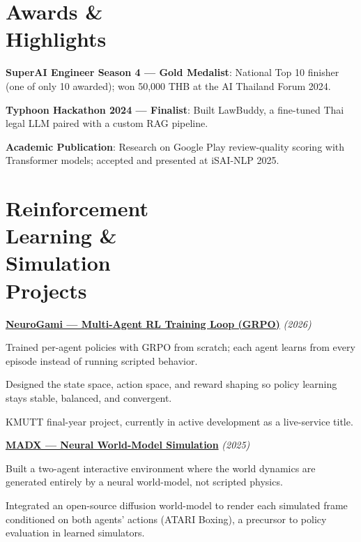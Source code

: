 \documentclass[margin,line]{resume}
\begin{document}
\begin{resume}
    \section{\mysidestyle \textbf{Awards \&\\Highlights}}
    \begin{list2}
    \item \textbf{SuperAI Engineer Season 4 --- Gold Medalist}: National Top 10 finisher (one of only 10 awarded); won 50,000 THB at the AI Thailand Forum 2024.
    \item \textbf{Typhoon Hackathon 2024 --- Finalist}: Built LawBuddy, a fine-tuned Thai legal LLM paired with a custom RAG pipeline.
    \item \textbf{Academic Publication}: Research on Google Play review-quality scoring with Transformer models; accepted and presented at iSAI-NLP 2025.
    \end{list2}
    \vspace{-3mm}

    \section{\mysidestyle \textbf{Reinforcement\\Learning \&\\Simulation\\Projects}}

    \underline{\textbf{NeuroGami --- Multi-Agent RL Training Loop (GRPO)}} \hfill \textit{(2026)} \vspace{0.3mm}
    \begin{list2}
    \item Trained per-agent policies with GRPO from scratch; each agent learns from every episode instead of running scripted behavior.
    \item Designed the state space, action space, and reward shaping so policy learning stays stable, balanced, and convergent.
    \item KMUTT final-year project, currently in active development as a live-service title.
    \end{list2}
    \vspace{-3mm}

    \underline{\textbf{MADX --- Neural World-Model Simulation}} \hfill \textit{(2025)} \vspace{0.3mm}
    \begin{list2}
    \item Built a two-agent interactive environment where the world dynamics are generated entirely by a neural world-model, not scripted physics.
    \item Integrated an open-source diffusion world-model to render each simulated frame conditioned on both agents' actions (ATARI Boxing), a precursor to policy evaluation in learned simulators.
    \end{list2}
    \vspace{-3mm}


\end{resume}
\end{document}
